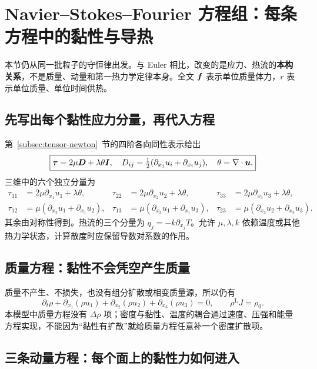 \section{Navier--Stokes--Fourier 方程组：每条方程中的黏性与导热}\label{sec:ns-three-views}

本节仍从同一批粒子的守恒律出发。与 Euler 相比，改变的是应力、热流的\textbf{本构关系}，不是质量、动量和第一热力学定律本身。全文 $\bm{f}$ 表示单位质量体力，$r$ 表示单位质量、单位时间供热。

\subsection{先写出每个黏性应力分量，再代入方程}

第~\ref{subsec:tensor-newton}~节的四阶各向同性表示给出
\begin{equation}
 \boxed{\bm{\tau}=2\mu\bm{D}+\lambda\theta\bm{I},
 \quad D_{ij}=\tfrac12(\partial_{x_j}u_i+\partial_{x_i}u_j),
 \quad\theta=\nabla\cdot\bm{u}.}\label{eq:newton-stress}
\end{equation}
三维中的六个独立分量为
\begin{align}
 \tau_{11}&=2\mu\partial_{x_1}u_1+\lambda\theta,&
 \tau_{22}&=2\mu\partial_{x_2}u_2+\lambda\theta,&
 \tau_{33}&=2\mu\partial_{x_3}u_3+\lambda\theta,\\
 \tau_{12}&=\mu(\partial_{x_2}u_1+\partial_{x_1}u_2),&
 \tau_{13}&=\mu(\partial_{x_3}u_1+\partial_{x_1}u_3),&
 \tau_{23}&=\mu(\partial_{x_3}u_2+\partial_{x_2}u_3).
\end{align}
其余由对称性得到。热流的三个分量为 $q_j=-k\partial_{x_j}T$。允许 $\mu,\lambda,k$ 依赖温度或其他热力学状态，计算散度时应保留导数对系数的作用。

\subsection{质量方程：黏性不会凭空产生质量}

质量不产生、不损失，也没有组分扩散或相变质量源，所以仍有
\begin{equation}
 \partial_t\rho+\partial_{x_1}(\rho u_1)+\partial_{x_2}(\rho u_2)
 +\partial_{x_3}(\rho u_3)=0,
 \qquad\rho^{\mathrm L}J=\rho_0.
\end{equation}
本模型中质量方程没有 $\Delta\rho$ 项；密度与黏性、温度的耦合通过速度、压强和能量方程实现，不能因为“黏性有扩散”就给质量方程任意补一个密度扩散项。

\subsection{三条动量方程：每个面上的黏性力如何进入}

